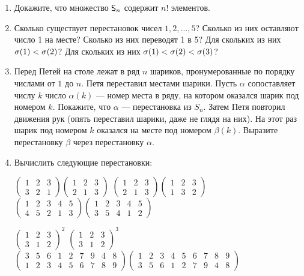 \begin{enumerate}
\item Докажите, что множество ${\mathsf{S}}_n$ содержит $n!$ элементов.

\item \ipunkt Сколько существует перестановок чисел $1, 2, \dots , 5$? Сколько
из них оставляют число 1 на месте? \ipunkt Сколько из них переводят 1
в 5? \ipunkt Для скольких из них $\sigma(1) < \sigma(2)$? \ipunkt Для скольких из них
$\sigma(1) < \sigma(2) < \sigma(3)$?


\item \label{peter} Перед Петей на столе лежат в ряд $n$ шариков, пронумерованные по порядку числами от $1$ до $n$. Петя переставил местами шарики. Пусть $\alpha$ сопоставляет числу $k$ число $\alpha(k)$ --- номер места в ряду, на котором оказался шарик под номером $k$. \ipunkt Покажите, что $\alpha$ --- перестановка из $S_n$.
\ipunkt Затем Петя повторил движения рук (опять переставил шарики, даже не глядя на них). На этот раз шарик под номером $k$ оказался на месте под номером $\beta(k)$. Выразите перестановку $\beta$ через перестановку $\alpha$.



\item Вычислить следующие перестановки:\label{count}

\noindent
\ipunkt $\displaystyle
\begin{pmatrix}
1&2&3 \\
3&2&1
\end{pmatrix}
\begin{pmatrix}
1&2&3 \\
2&1&3
\end{pmatrix}
$
\ipunkt $\displaystyle
\begin{pmatrix}
1&2&3 \\
2&1&3
\end{pmatrix}
\begin{pmatrix}
1&2&3 \\
1&3&2
\end{pmatrix}
$
\ipunkt 
$\displaystyle
\begin{pmatrix}
1&2&3&4&5 \\
4&5&2&1&3
\end{pmatrix}
\begin{pmatrix}
1&2&3&4&5 \\
3&5&4&1&2
\end{pmatrix}
$

\noindent
\ipunkt $\displaystyle
\begin{pmatrix}
1&2&3 \\
3&1&2
\end{pmatrix}^2
$
\ipunkt $\displaystyle
\begin{pmatrix}
1&2&3 \\
3&1&2
\end{pmatrix}^3
$
\ipunkt
$
\begin{pmatrix}
3&5&6&1&2&7&9&4&8 \\
1&2&3&4&5&6&7&8&9
\end{pmatrix}
\begin{pmatrix}
1&2&3&4&5&6&7&8&9 \\
3&5&6&1&2&7&9&4&8
\end{pmatrix}
$


\end{enumerate}
